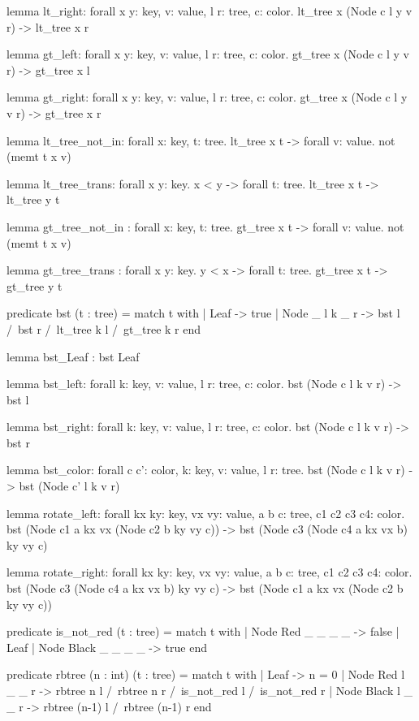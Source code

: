 \begin{whylang}
  lemma lt_right:
    forall x y: key, v: value,  l r: tree, c: color.
    lt_tree x (Node c l y v r) -> lt_tree x r

  lemma gt_left:
    forall x y: key, v: value, l r: tree, c: color.
    gt_tree x (Node c l y v r) -> gt_tree x l

  lemma gt_right:
    forall x y: key, v: value, l r: tree, c: color.
    gt_tree x (Node c l y v r) -> gt_tree x r

  lemma lt_tree_not_in:
    forall x: key, t: tree. lt_tree x t -> forall v: value. not (memt t x v)

  lemma lt_tree_trans:
    forall x y: key. x < y -> forall t: tree. lt_tree x t -> lt_tree y t

  lemma gt_tree_not_in :
    forall x: key, t: tree. gt_tree x t -> forall v: value. not (memt t x v)

  lemma gt_tree_trans :
    forall x y: key. y < x -> forall t: tree. gt_tree x t -> gt_tree y t

  predicate bst (t : tree) =
    match t with
    | Leaf -> true
    | Node _ l k _ r -> bst l /\ bst r /\ lt_tree k l /\ gt_tree k r
    end

  lemma bst_Leaf : bst Leaf

  lemma bst_left:
    forall k: key, v: value, l r: tree, c: color. bst (Node c l k v r) -> bst l

  lemma bst_right:
    forall k: key, v: value, l r: tree, c: color. bst (Node c l k v r) -> bst r

  lemma bst_color:
    forall c c': color, k: key, v: value, l r: tree.
    bst (Node c l k v r) -> bst (Node c' l k v r)

  lemma rotate_left:
    forall kx ky: key, vx vy: value, a b c: tree, c1 c2 c3 c4: color.
    bst (Node c1 a kx vx (Node c2 b ky vy c)) ->
    bst (Node c3 (Node c4 a kx vx b) ky vy c)

  lemma rotate_right:
    forall kx ky: key, vx vy: value, a b c: tree, c1 c2 c3 c4: color.
    bst (Node c3 (Node c4 a kx vx b) ky vy c) ->
    bst (Node c1 a kx vx (Node c2 b ky vy c))

  predicate is_not_red (t : tree) =
    match t with
    | Node Red _ _ _ _ -> false
    | Leaf | Node Black _ _ _ _ -> true
    end

  predicate rbtree (n : int) (t : tree) =
    match t with
    | Leaf ->
        n = 0
    | Node Red   l _ _ r ->
        rbtree n l /\ rbtree n r /\ is_not_red l /\ is_not_red r
    | Node Black l _ _ r ->
        rbtree (n-1) l /\ rbtree (n-1) r
    end


\end{whylang}
